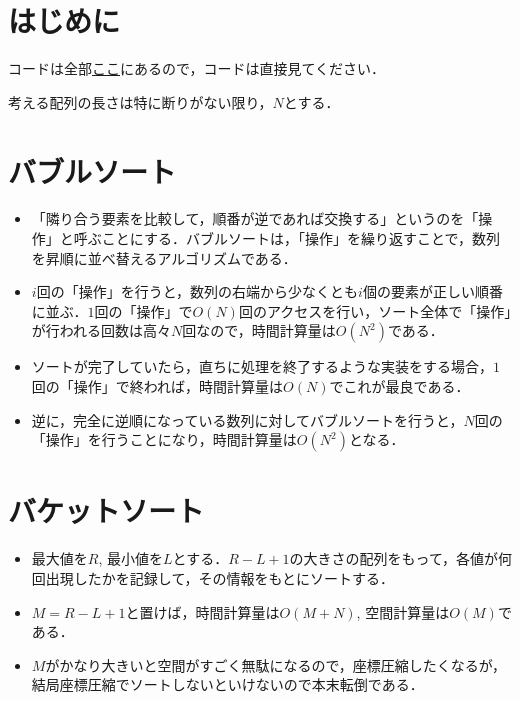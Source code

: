 \documentclass[slide,20pt]{ltjsarticle}
\begin{document}
\pagestyle{fancy}
\fancyhf{} %
\fancyfoot[C]{} %
\renewcommand{\headrulewidth}{0pt} %

\tableofcontents
\newpage

\pagestyle{plain}

\setcounter{page}{2}

\section{はじめに}

コードは全部\textcolor{red}{\href{https://github.com/kk2a/algo_data}{ここ}}にあるので，コードは直接見てください．

考える配列の長さは特に断りがない限り，$N$とする．

\section{バブルソート}

\begin{itemize}
  \item 「隣り合う要素を比較して，順番が逆であれば交換する」というのを「操作」と呼ぶことにする．バブルソートは，「操作」を繰り返すことで，数列を昇順に並べ替えるアルゴリズムである．
  \item $i$回の「操作」を行うと，数列の右端から少なくとも$i$個の要素が正しい順番に並ぶ．$1$回の「操作」で$O(N)$回のアクセスを行い，ソート全体で「操作」が行われる回数は高々$N$回なので，時間計算量は$O(N ^ 2)$である．
  \item ソートが完了していたら，直ちに処理を終了するような実装をする場合，$1$回の「操作」で終われば，時間計算量は$O(N)$でこれが最良である．
  \item 逆に，完全に逆順になっている数列に対してバブルソートを行うと，$N$回の「操作」を行うことになり，時間計算量は$O(N ^ 2)$となる．
\end{itemize}

\section{バケットソート}

\begin{itemize}
  \item 最大値を$R$, 最小値を$L$とする．$R - L + 1$の大きさの配列をもって，各値が何回出現したかを記録して，その情報をもとにソートする．
  \item $M = R - L + 1$と置けば，時間計算量は$O(M + N)$, 空間計算量は$O(M)$である．
  \item $M$がかなり大きいと空間がすごく無駄になるので，座標圧縮したくなるが，結局座標圧縮でソートしないといけないので本末転倒である．
\end{itemize}
\end{document}
